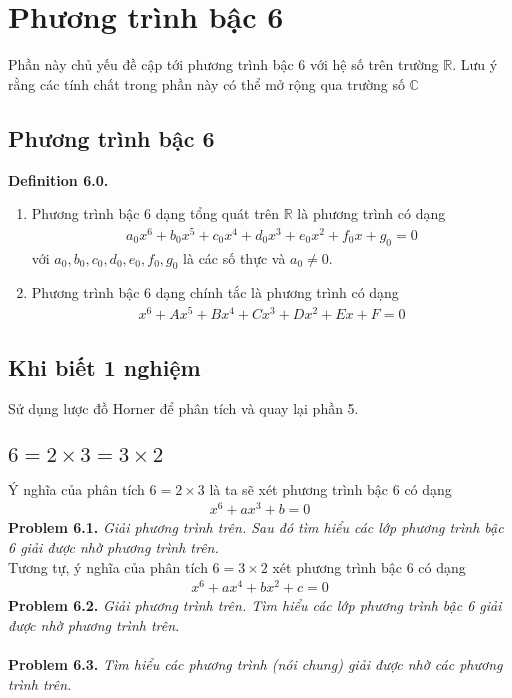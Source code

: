 \documentclass[a4paper,oneside]{book}
\numberwithin{equation}{chapter}
\begin{document}
\chapter{Phương trình bậc 6}

Phần này chủ yếu đề cập tới phương trình bậc 6 với hệ số trên trường $\mathbb{R}$. Lưu ý rằng các tính chất trong phần này có thể mở rộng qua trường số $\mathbb{C}$
\section{Phương trình bậc 6}
\textbf{Definition 6.0.} 
\begin{enumerate}
\item Phương trình bậc 6 dạng tổng quát trên $\mathbb{R}$ là phương trình có dạng
\begin{align}
{a_0}{x^6} + {b_0}{x^5} + {c_0}{x^4} + {d_0}x^3 + {e_0}x^2+f_0 x+ g_0 = 0
\end{align}
với $a_0,b_0,c_0,d_0,e_0,f_0,g_0$ là các số thực và $a_0 \ne 0$.
\item Phương trình bậc 6 dạng chính tắc là phương trình có dạng
\begin{align}
{x^6} + A{x^5} + B{x^4} + C{x^3} + D{x^2} + Ex + F = 0
\end{align}

\end{enumerate}

\section{Khi biết 1 nghiệm}
Sử dụng lược đồ Horner để phân tích và quay lại phần 5.
\section{$6=2\times 3=3\times 2$}
Ý nghĩa của phân tích $6=2\times 3$ là ta sẽ xét phương trình bậc 6 có dạng 
\begin{align}
{x^6} + a{x^3} + b = 0
\end{align}
\textbf{Problem 6.1.} \textit{Giải phương trình trên. Sau đó tìm hiểu các lớp phương trình bậc 6 giải được nhờ phương trình trên.}\\

Tương tự, ý nghĩa của phân tích $6=3\times 2$ xét phương trình bậc 6 có dạng
\begin{align}
{x^6} + a{x^4} + b{x^2} + c = 0
\end{align}
\textbf{Problem 6.2.} \textit{Giải phương trình trên. Tìm hiểu các lớp phương trình bậc 6 giải được nhờ phương trình trên.}\\
\\
\textbf{Problem 6.3.} \textit{Tìm hiểu các phương trình (nói chung) giải được nhờ các phương trình trên.}
\end{document}
